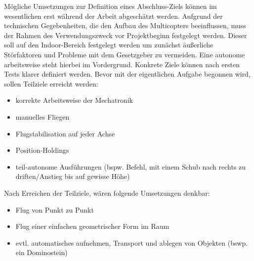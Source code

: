 \documentclass[12pt,a4paper]{article}
\begin{document}
	Mögliche Umsetzungen zur Definition eines Abschluss-Ziels können im wesentlichen erst während der Arbeit abgeschätzt werden. 
	Aufgrund der technischen Gegebenheiten, die den Aufbau des Multicopters beeinflussen, muss der Rahmen des Verwendungszweck vor Projektbeginn 
	festgelegt werden. Dieser soll auf den Indoor-Bereich festgelegt werden um zunächst äußerliche Störfaktoren und Probleme mit dem Gesetzgeber zu 
	vermeiden. Eine autonome arbeitsweise steht hierbei im Vordergrund. Konkrete Ziele können nach ersten Tests klarer definiert werden. Bevor mit der 
	eigentlichen Aufgabe begonnen wird, sollen Teilziele erreicht werden:
	\begin{itemize}
		\item korrekte Arbeitsweise der Mechatronik
		\item manuelles Fliegen		
		\item Flugstabilisation auf jeder Achse
		\item Position-Holdings
		\item teil-autonome Ausführungen (bspw. Befehl, mit einem Schub nach rechts zu driften/Anstieg bis auf gewisse Höhe) 
	\end{itemize}
	
	Nach Erreichen der Teilziele, wären folgende Umsetzungen denkbar:	
	\begin{itemize}
		\item 	Flug von Punkt zu Punkt
		\item 	Flug einer einfachen geometrischer Form im Raum
		\item	evtl. automatisches aufnehmen, Transport und ablegen von Objekten (bswp. ein Dominostein)
	\end{itemize} 
\end{document}
